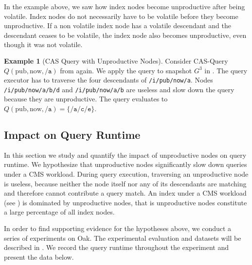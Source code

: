 \documentclass[abstracton,12pt]{scrartcl}
\theoremstyle{definition}
\newtheorem{example}{Example}
\begin{document}
In the example above, we saw how index nodes become unproductive after being
volatile. Index nodes do not necessarily have to be volatile before they become
unproductive.
If a non volatile index node has a volatile descendant and the descendant ceases to
be volatile, the index node also becomes unproductive, even though it was not
volatile.

\begin{example}[CAS Query with Unproductive Nodes]
  Consider CAS-Query $Q(\text{pub},\text{now},\texttt{/a})$ from
   again. We apply the query to snapshot $G^3$ in
  . The query executor has to traverse the four
  descendants of \texttt{/i/pub/now/a}. Nodes
  \texttt{/i/pub/now/a/b/d} and \texttt{/i/pub/now/a/b} are useless and slow down the
  query because they are unproductive. The query evaluates to
  $Q(\text{pub},\text{now},\texttt{/a}) = \{\texttt{/a/c/e}\}$.
\end{example}

\subsection{Impact on Query Runtime}

In this section we study and quantify the impact of unproductive nodes on
query runtime. We hypothesize that unproductive nodes
significantly slow down queries under a CMS workload. During query
execution, traversing an unproductive node is
useless, because neither the node itself nor any of its descendants are matching
and therefore cannot contribute a query match.
An index under a CMS workload (see ) is dominated
by unproductive nodes, that is unproductive nodes constitute a large percentage
of all index nodes.



In order to find supporting evidence for the hypotheses above, we conduct a series of
experiments on Oak. The experimental evaluation and
datasets will be described in . We
record the query runtime throughout the experiment and present the data below.
\end{document}
